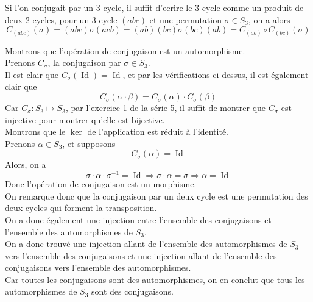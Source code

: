 \documentclass[11pt, a4paper]{article}
\DeclareMathOperator*{\id}{Id}
\begin{document}
Si l'on conjugait par un 3-cycle, il suffit d'ecrire le 3-cycle comme un produit de deux 2-cycles, pour un 3-cycle $( abc) $ et une permutation $\sigma \in S_3$, on a alors
\[ 
	C_{( abc) } ( \sigma) = ( abc) \sigma ( acb) = ( ab) ( bc) \sigma ( bc) ( ab) = C_{( ab) } \circ C_{( bc) } ( \sigma) 
\]

Montrons que l'opération de conjugaison est un automorphisme.\\
Prenons $C_\sigma$, la conjugaison par $\sigma \in S_3$.\\
Il est clair que $C_{\sigma} ( \id) = \id $, et par les vérifications ci-dessus, il est également clair que
\[ 
	C_\sigma( \alpha \cdot \beta) = C_\sigma ( \alpha) \cdot C_\sigma( \beta) 
\]
Car $C_\sigma: S_3 \mapsto S_3$, par l'exercice 1 de la série 5, il suffit de montrer que $C_\sigma$ est injective pour montrer qu'elle est bijective.\\
Montrons que le $\ker$ de l'application est réduit à l'identité.\\
Prenons $\alpha \in S_3$, et supposons 
\[ 
	C_\sigma( \alpha) = \id
\]
Alors, on a
\[ 
\sigma \cdot \alpha \cdot \sigma^{-1} = \id \Rightarrow \sigma \cdot \alpha = \sigma \Rightarrow \alpha= \id
\]
Donc l'opération de conjugaison est un morphisme.\\




On remarque donc que la conjugaison par un deux cycle est une permutation des deux-cycles qui forment la transposition.\\
On a donc également une injection entre l'ensemble des conjugaisons et l'ensemble des automorphismes de $S_3$.\\
On a donc trouvé une injection allant de l'ensemble des automorphismes de $S_3$ vers l'ensemble des conjugaisons et une injection allant de l'ensemble des conjugaisons vers l'ensemble des automorphismes.\\
Car toutes les conjugaisons sont des automorphismes, on en conclut que tous les automorphismes de $S_3$ sont des conjugaisons.
\end{document}
